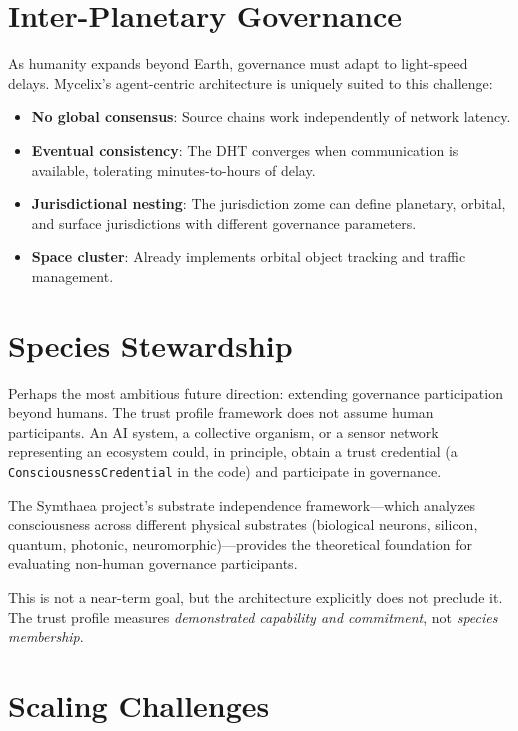 \documentclass[12pt]{book}
\begin{document}
\section{Inter-Planetary Governance}

As humanity expands beyond Earth, governance must adapt to light-speed delays.
Mycelix's agent-centric architecture is uniquely suited to this challenge:

\begin{itemize}
  \item \textbf{No global consensus}: Source chains work independently of
    network latency.
  \item \textbf{Eventual consistency}: The DHT converges when communication is
    available, tolerating minutes-to-hours of delay.
  \item \textbf{Jurisdictional nesting}: The jurisdiction zome can define
    planetary, orbital, and surface jurisdictions with different governance
    parameters.
  \item \textbf{Space cluster}: Already implements orbital object tracking
    and traffic management.
\end{itemize}

\section{Species Stewardship}

Perhaps the most ambitious future direction: extending governance participation
beyond humans. The trust profile framework does not assume human participants. An AI system, a collective organism, or a sensor network
representing an ecosystem could, in principle, obtain a trust credential
(a \texttt{ConsciousnessCredential} in the code) and participate in governance.

The Symthaea project's substrate independence framework---which analyzes
consciousness across different physical substrates (biological neurons, silicon,
quantum, photonic, neuromorphic)---provides the theoretical foundation for
evaluating non-human governance participants.

This is not a near-term goal, but the architecture explicitly does not preclude
it. The trust profile measures \emph{demonstrated capability and commitment},
not \emph{species membership}.

\section{Scaling Challenges}
\end{document}
